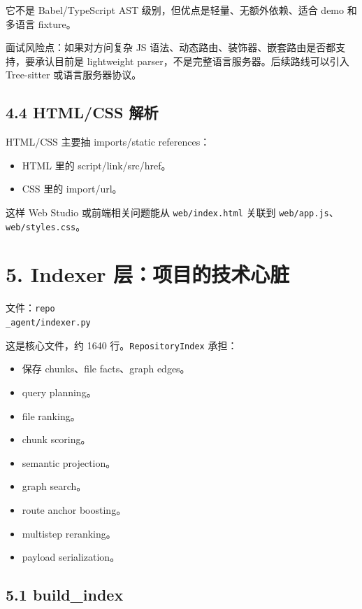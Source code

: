\documentclass[UTF8,12pt,openany]{ctexbook}
\begin{document}
它不是 Babel/TypeScript AST 级别，但优点是轻量、无额外依赖、适合 demo 和多语言 fixture。\par

面试风险点：如果对方问复杂 JS 语法、动态路由、装饰器、嵌套路由是否都支持，要承认目前是 lightweight parser，不是完整语言服务器。后续路线可以引入 Tree-sitter 或语言服务器协议。\par

\subsection{4.4 HTML/CSS 解析}

HTML/CSS 主要抽 imports/static references：\par

\begin{itemize}
\item HTML 里的 script/link/src/href。
\item CSS 里的 import/url。
\end{itemize}

这样 Web Studio 或前端相关问题能从 \texttt{web/index.html} 关联到 \texttt{web/app.js}、\texttt{web/styles.css}。\par

\section{5. Indexer 层：项目的技术心脏}

文件：\texttt{repo\\_agent/indexer.py}\par

这是核心文件，约 1640 行。\texttt{RepositoryIndex} 承担：\par

\begin{itemize}
\item 保存 chunks、file facts、graph edges。
\item query planning。
\item file ranking。
\item chunk scoring。
\item semantic projection。
\item graph search。
\item route anchor boosting。
\item multistep reranking。
\item payload serialization。
\end{itemize}

\subsection{5.1 build\_index}
\end{document}
